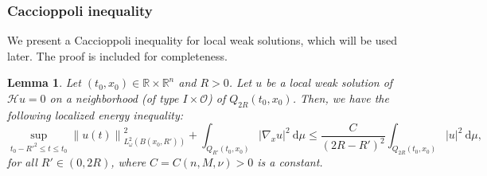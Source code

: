 \documentclass[12pt, letterpaper]{amsart}
\newtheorem{lem}[thm]{Lemma}
\theoremstyle{definition}
\theoremstyle{remark}
\numberwithin{equation}{section}
\begin{document}
\subsubsection{Caccioppoli inequality} 
We present a Caccioppoli inequality for local weak solutions, which will be used later. The proof is included for completeness.
\begin{lem}\label{lem:Caccioppoli}
    Let $(t_0,x_0)\in \mathbb{R}\times \mathbb{R}^n$ and $R>0$. Let $u$ be a local weak solution of $\mathcal{H}u=0$ on a neighborhood (of type $I \times \mathcal{O}$) of $Q_{2R}(t_0,x_0)$. Then, we have the following localized energy inequality:
    \begin{equation*}
       \sup_{t_0-R'^2 \leq t \leq t_0 } \left\|u(t) \right\|^2_{L^2_\omega(B(x_0,R'))} + \int_{Q_{R'}(t_0,x_0)} \left | \nabla_x u \right |^2 \ \mathrm d\mu \leq \frac{C}{(2R-R')^2} \int_{Q_{2R}(t_0,x_0)} \left |  u \right |^2 \ \mathrm d\mu,
    \end{equation*}
    for all $R'\in (0,2R)$, where $C=C(n,M,\nu)>0$ is a constant.
\end{lem}
\end{document}
